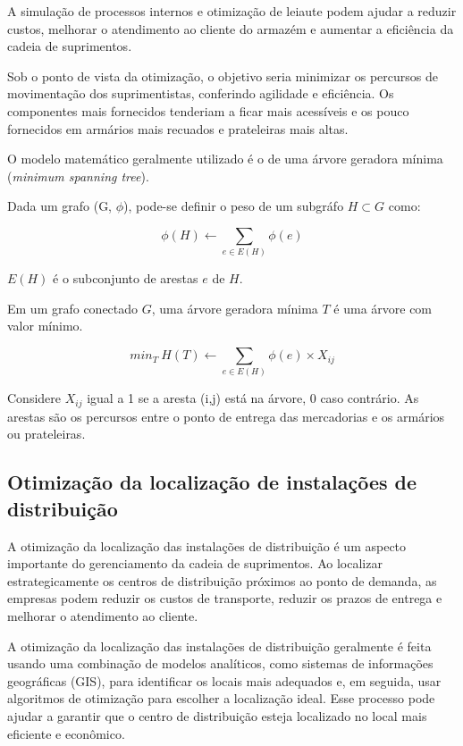\documentclass{article}
\begin{document}
A simulação de processos internos e otimização de leiaute podem ajudar a reduzir custos, melhorar o atendimento ao cliente do armazém e aumentar a eficiência da cadeia de suprimentos.

Sob o ponto de vista da otimização, o objetivo seria minimizar os percursos de movimentação dos suprimentistas, conferindo agilidade e eficiência. Os componentes mais fornecidos tenderiam a ficar mais acessíveis e os pouco fornecidos em armários mais recuados e prateleiras mais altas.

O modelo matemático geralmente utilizado é o de uma árvore geradora mínima ({\it minimum spanning tree}).

Dada um grafo (G, $\phi$), pode-se definir o peso de um subgráfo $H \subset G$ como:

\begin{equation} \label{eq:fo1}
	\phi(H) \gets \sum_{e \in E(H)} \phi (e)
\end{equation}

$E(H)$ é o subconjunto de arestas $e$ de $H$.

Em um grafo conectado $G$, uma árvore geradora mínima $T$ é uma árvore com valor mínimo.

\begin{equation} \label{eq:fo2}
	min_T\ H(T) \gets \sum_{e \in E(H)} \phi (e) \times X_{ij}
\end{equation}


Considere $X_{ij}$ igual a 1 se a aresta (i,j) está na árvore, 0 caso contrário. As arestas são os percursos entre o ponto de entrega das mercadorias e os armários ou prateleiras.



\subsection{Otimização da localização de instalações de distribuição}

A otimização da localização das instalações de distribuição é um aspecto importante do gerenciamento da cadeia de suprimentos. Ao localizar estrategicamente os centros de distribuição próximos ao ponto de demanda, as empresas podem reduzir os custos de transporte, reduzir os prazos de entrega e melhorar o atendimento ao cliente.

A otimização da localização das instalações de distribuição geralmente é feita usando uma combinação de modelos analíticos, como sistemas de informações geográficas (GIS), para identificar os locais mais adequados e, em seguida, usar algoritmos de otimização para escolher a localização ideal. Esse processo pode ajudar a garantir que o centro de distribuição esteja localizado no local mais eficiente e econômico.
\end{document}
